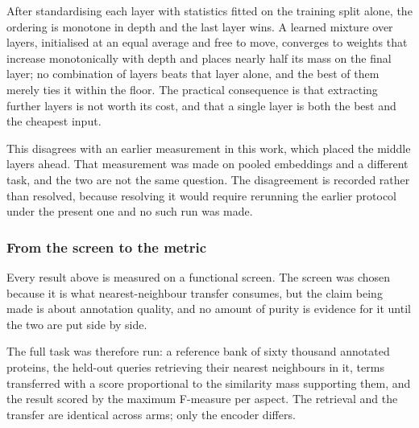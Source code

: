 After standardising each layer with statistics fitted on the training split alone,
the ordering is monotone in depth and the last layer wins. A learned mixture over
layers, initialised at an equal average and free to move, converges to weights that
increase monotonically with depth and places nearly half its mass on the final layer;
no combination of layers beats that layer alone, and the best of them merely ties it
within the floor. The practical consequence is that extracting further layers is not
worth its cost, and that a single layer is both the best and the cheapest input.

This disagrees with an earlier measurement in this work, which placed the middle
layers ahead. That measurement was made on pooled embeddings and a different task,
and the two are not the same question. The disagreement is recorded rather than
resolved, because resolving it would require rerunning the earlier protocol under the
present one and no such run was made.

\subsubsection{From the screen to the metric}
\label{sec:exp14-fmax}

Every result above is measured on a functional screen. The screen was chosen because
it is what nearest-neighbour transfer consumes, but the claim being made is about
annotation quality, and no amount of purity is evidence for it until the two are put
side by side.

The full task was therefore run: a reference bank of sixty thousand annotated
proteins, the held-out queries retrieving their nearest neighbours in it, terms
transferred with a score proportional to the similarity mass supporting them, and the
result scored by the maximum F-measure per aspect. The retrieval and the transfer are
identical across arms; only the encoder differs.

\begin{table}[htbp]
  \centering
  \caption{Maximum F-measure on the full retrieval and transfer task, against the
  deployed encoder, scored against propagated reference closures over the whole
  evaluation set. Intervals are 2{,}000 bootstrap draws paired on proteins.
  \textbf{These figures do not survive the stratification of
  Section~\ref{sec:exp14-category}} and are kept because the size of the difference
  between the two protocols is itself the result.}
  \label{tab:exp14-fmax}
  
\end{table}

